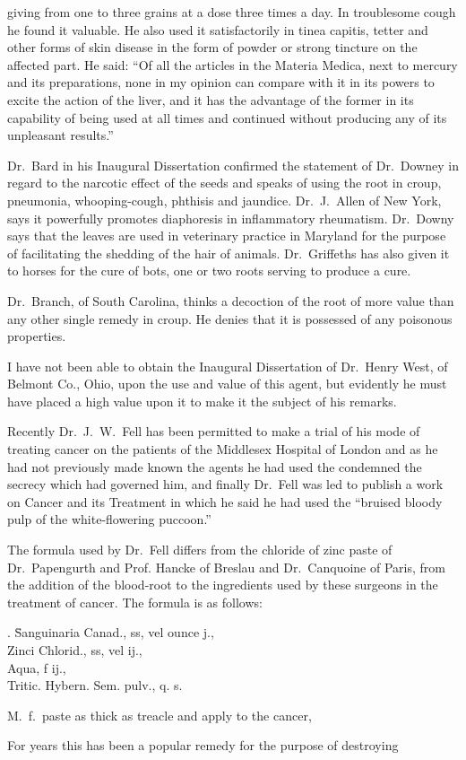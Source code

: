giving from one to three grains at a dose three times a day. In
troublesome cough he found it valuable. He also used it satisfactorily
in tinea capitis, tetter and other forms of skin disease in the form of
powder or strong tincture on the affected part. He said: ``Of all
the articles in the Materia Medica, next to mercury and its preparations,
none in my opinion can compare with it in its powers to excite the
action of the liver, and it has the advantage of the former in its capability
of being used at all times and continued without producing any
of its unpleasant results.''

Dr.\ Bard in his Inaugural Dissertation confirmed the statement of
Dr.\ Downey in regard to the narcotic effect of the seeds and speaks
of using the root in croup, pneumonia, whooping-cough, phthisis and
jaundice. Dr.\ J.\ Allen of New York, says it powerfully promotes diaphoresis
in inflammatory rheumatism. Dr.\ Downy says that the leaves
are used in veterinary practice in Maryland for the purpose of facilitating
the shedding of the hair of animals. Dr.\ Griffeths has also given it to
horses for the cure of bots, one or two roots serving to produce a cure.

Dr.\ Branch, of South Carolina, thinks a decoction of the root of
more value than any other single remedy in croup. He denies that it
is possessed of any poisonous properties.

I have not been able to obtain the Inaugural Dissertation of Dr.\ Henry
West, of Belmont Co., Ohio, upon the use and value of this
agent, but evidently he must have placed a high value upon it to make
it the subject of his remarks.

Recently Dr.\ J.\ W.\ Fell has been permitted to make a trial of his
mode of treating cancer on the patients of the Middlesex Hospital of London
and as he had not previously made known the agents he had used
the  condemned the secrecy which had governed him, and
finally Dr.\ Fell was led to publish a work on Cancer and its Treatment
in which he said he had used the ``bruised bloody pulp of the white-flowering
puccoon.''

The formula used by Dr.\ Fell differs from the chloride of zinc
paste of Dr.\ Papengurth and Prof. Hancke of Breslau and Dr.\ Canquoine
of Paris, from the addition of the blood-root to the ingredients used by
these surgeons in the treatment of cancer.   The formula is as follows:

\begin{center}
\begin{tabbing}
  \prescription. \= Sanguinaria Canad., \ounce ss, vel ounce j., \\
    \> Zinci Chlorid., \ounce ss, vel \ounce ij., \\
    \> Aqua, f \ounce ij., \\
    \> Tritic. Hybern. Sem. pulv., q. s.
\end{tabbing}
\end{center}
M.\ f.\ paste as thick as treacle and apply to the cancer,

For years this has been a popular remedy for the purpose of destroying\endinput
